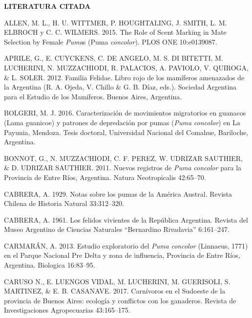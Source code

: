 \documentclass[
  x11names]{article}
\begin{document}
%
\begin{table}[H]
\centering
\begin{tabular}[t]{>{\raggedright\arraybackslash}m{16cm}>{}m{16cm}}
\toprule
\cellcolor{ceil}{\textcolor{white}{\textbf{\rule{0pt}{14pt}BIBLIOGRAFÍA}}}\\
\bottomrule
\end{tabular}
\end{table}

\setlength{\parindent}{20pt}\noindent\textbf{LITERATURA CITADA}

ALLEN, M. L., H. U. WITTMER, P. HOUGHTALING, J. SMITH, L. M. ELBROCH y
C. C. WILMERS. 2015. The Role of Scent Marking in Mate Selection by
Female \textit{Puma}s (Puma \textit{concolor}). PLOS ONE 10:e0139087.

APRILE, G., E. CUYCKENS, C. DE ANGELO, M. S. DI BITETTI, M. LUCHERINI,
N. MUZZACHIODI, R. PALACIOS, A. PAVIOLO, V. QUIROGA, \& L. SOLER. 2012.
Familia Felidae. Libro rojo de los mamíferos amenazados de la Argentina
(R. A. Ojeda, V. Chillo \& G. B. Díaz, eds.). Sociedad Argentina para el
Estudio de los Mamíferos. Buenos Aires, Argentina.

BOLGERI, M. J. 2016. Caracterización de movimientos migratorios en
guanacos (Lama guanicoe) y patrones de depredación por pumas
(\textit{Puma} \textit{concolor}) en La Payunia, Mendoza. Tesis
doctoral, Universidad Nacional del Comahue, Bariloche, Argentina.

BONNOT, G., N. MUZZACHIODI, C. F. PEREZ, W. UDRIZAR SAUTHIER, \& D.
UDRIZAR SAUTHIER. 2011. Nuevos registros de \textit{Puma}
\textit{concolor} para la Provincia de Entre Ríos, Argentina. Natura
Neotropicalis 42:65--70.

CABRERA, A. 1929. Notas sobre los pumas de la América Austral. Revista
Chilena de Historia Natural 33:312--320.

CABRERA, A. 1961. Los felidos vivientes de la República Argentina.
Revista del Museo Argentino de Ciencias Naturales ``Bernardino
Rivadavia'' 6:161--247.

CARMARÁN, A. 2013. Estudio exploratorio del \textit{Puma}
\textit{concolor} (Linnaeus, 1771) en el Parque Nacional Pre Delta y
zona de influencia, Provincia de Entre Ríos, Argentina. Biologica
16:83--95.

CARUSO N., E. LUENGOS VIDAL, M. LUCHERINI, M. GUERISOLI, S. MARTINEZ, \&
E. B. CASANAVE. 2017. Carnívoros en el Sudoeste de la provincia de
Buenos Aires: ecología y conflictos con los ganaderos. Revista de
Investigaciones Agropecuarias 43:165--175.
\end{document}
